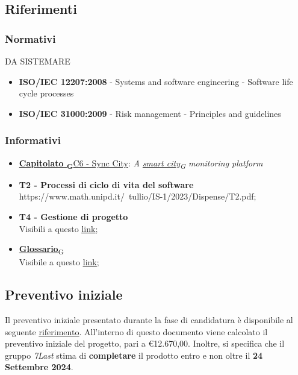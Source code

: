 \subsection{Riferimenti}
    \subsubsection{Normativi}DA SISTEMARE
        \begin{itemize}
            \item \textbf{ISO/IEC 12207:2008} - Systems and software engineering - Software life cycle processes
            \item \textbf{ISO/IEC 31000:2009} - Risk management - Principles and guidelines
        \end{itemize}
    \subsubsection{Informativi}
        \begin{itemize}
            \item \href{https://7last.github.io/docs/rtb/documentazione-interna/glossario#capitolato}{\textbf{Capitolato \textsubscript{G}}C6 - Sync City}: \textit{A \href{https://7last.github.io/docs/rtb/documentazione-interna/glossario#smart-city}{smart city\textsubscript{G}} monitoring platform}
            \item \textbf{T2 - Processi di ciclo di vita del software}\\ https://www.math.unipd.it/~tullio/IS-1/2023/Dispense/T2.pdf;
            \item \textbf{T4 - Gestione di progetto}\\ Visibili a questo \uline{\href{https://www.math.unipd.it/~tullio/IS-1/2023/Dispense/T4.pdf}{link}};
            \item \href{https://7last.github.io/docs/rtb/documentazione-interna/glossario#glossario}{\textbf{Glossario}\textsubscript{G}}\\ Visibile a questo \uline{\href{https://7last.github.io/docs/rtb/documentazione-interna/glossario}{link}};
        \end{itemize}
\subsection{Preventivo iniziale}
Il preventivo iniziale presentato durante la fase di candidatura è disponibile al seguente \uline{\href{https://github.com/7Last/docs/blob/main/1_candidatura/preventivo_costi_assunzione_impegni_v2.0.pdf}{riferimento}}. All'interno di questo documento viene calcolato il preventivo iniziale del progetto, pari a €12.670,00. Inoltre, si specifica che il gruppo \textit{7Last} stima di \textbf{completare} il prodotto entro e non oltre il \textbf{24 Settembre 2024}.